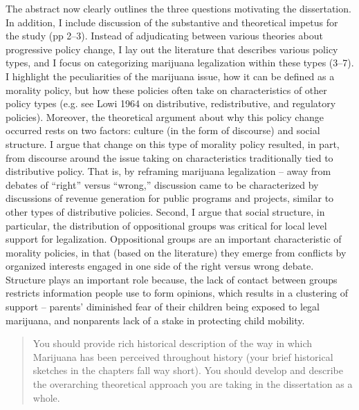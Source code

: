 \documentclass[12pt,stdletter,dateno,sigleft]{newlfm} %
\begin{document}
\begin{newlfm}
The abstract now clearly outlines the three questions motivating the dissertation. In addition, I include discussion of the substantive and theoretical impetus for the study (pp 2--3). Instead of adjudicating between various theories about progressive policy change, I lay out the literature that describes various policy types, and I focus on categorizing marijuana legalization within these types (3--7). I highlight the peculiarities of the marijuana issue, how it can be defined as a morality policy, but how these policies often take on characteristics of other policy types (e.g. see Lowi 1964 on distributive, redistributive, and regulatory policies). Moreover, the theoretical argument about why this policy change occurred rests on two factors: culture (in the form of discourse) and social structure. I argue that change on this type of morality policy resulted, in part, from discourse around the issue taking on characteristics traditionally tied to distributive policy. That is, by reframing marijuana legalization -- away from debates of ``right'' versus ``wrong,'' discussion came to be characterized by discussions of revenue generation for public programs and projects, similar to other types of distributive policies. Second, I argue that social structure, in particular, the distribution of oppositional groups was critical for local level support for legalization. Oppositional groups are an important characteristic of morality policies, in that (based on the literature) they emerge from conflicts by organized interests engaged in one side of the right versus wrong debate. Structure plays an important role because, the lack of contact between groups restricts information people use to form opinions, which results in a clustering of support -- parents' diminished fear of their children being exposed to legal marijuana, and nonparents lack of a stake in protecting child mobility.  



\begin{quotation}{\color{red}\noindent \footnotesize
You should provide rich historical description of the way in which Marijuana has been perceived throughout history (your brief historical sketches in the chapters fall way short).  You should develop and describe the overarching theoretical approach you are taking in the dissertation as a whole.
}
\end{quotation}



\end{newlfm}
\end{document}
